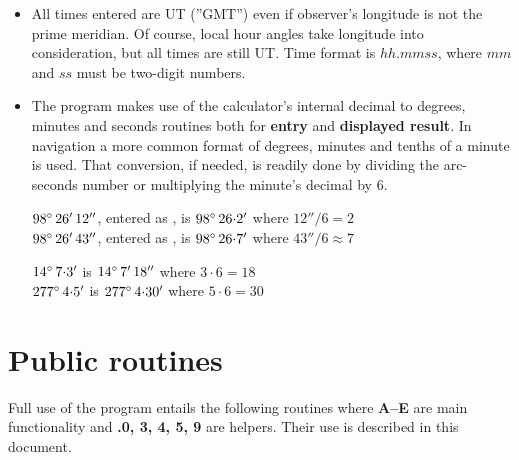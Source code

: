 \documentclass[english,a4paper,onepage, 10pt]{scrbook}
\begin{document}
\begin{itemize}
\item All times entered are UT (''GMT'') even if observer's longitude is not the prime meridian. Of course, local hour angles take longitude into consideration, but all times are still UT. Time format is $hh.mmss$, where $mm$ and $ss$ must be two-digit numbers.


\item The program makes use of the calculator's internal decimal to degrees, minutes and seconds routines both for \textbf{entry} and \textbf{displayed result}. In navigation a more common format of degrees, minutes and tenths of a minute is used. That conversion, if needed, is readily done by dividing the arc-seconds number or multiplying the minute's decimal by 6.


 $98\degree\, 26'\, 12''$, entered as ,  is $98\degree\, 26{\cdot}2'$ where $12''/6=2$\\
 $98\degree\, 26'\, 43''$, entered as , is $98\degree\, 26{\cdot}7'$ where $43''/6\approx7$
 \slutex
 

 $14\degree\, 7{\cdot}3'$  is $14\degree\, 7'\, 18''$ where $3 \cdot 6=18$\\
 $277\degree\, 4{\cdot}5'$  is $277\degree\, 4{\cdot}30'$ where $5 \cdot 6=30$
 \slutex
 
\end{itemize}
 

\section{Public routines} 

Full use of the program entails the following routines where \textbf{\textsf{A--E}} are main functionality and \textbf{\textsf{.0, 3, 4, 5, 9}} are helpers. Their use is described in this document. 
\end{document}
